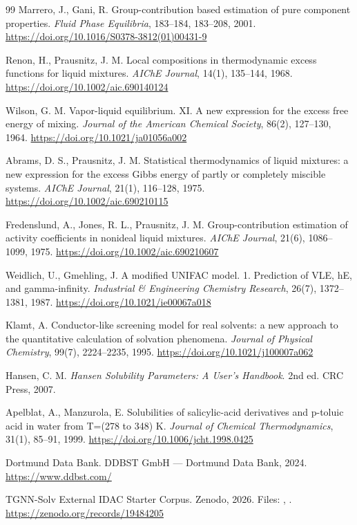 \documentclass[11pt]{article}
\DeclareRobustCommand{\code}[1]{\texttt{\detokenize{#1}}}
\theoremstyle{definition}
\begin{document}
\begin{thebibliography}{99}
 Marrero, J., Gani, R. Group-contribution based estimation of pure component properties. \textit{Fluid Phase Equilibria}, 183--184, 183--208, 2001. \url{https://doi.org/10.1016/S0378-3812(01)00431-9}

 Renon, H., Prausnitz, J. M. Local compositions in thermodynamic excess functions for liquid mixtures. \textit{AIChE Journal}, 14(1), 135--144, 1968. \url{https://doi.org/10.1002/aic.690140124}

 Wilson, G. M. Vapor-liquid equilibrium. XI. A new expression for the excess free energy of mixing. \textit{Journal of the American Chemical Society}, 86(2), 127--130, 1964. \url{https://doi.org/10.1021/ja01056a002}

 Abrams, D. S., Prausnitz, J. M. Statistical thermodynamics of liquid mixtures: a new expression for the excess Gibbs energy of partly or completely miscible systems. \textit{AIChE Journal}, 21(1), 116--128, 1975. \url{https://doi.org/10.1002/aic.690210115}

 Fredenslund, A., Jones, R. L., Prausnitz, J. M. Group-contribution estimation of activity coefficients in nonideal liquid mixtures. \textit{AIChE Journal}, 21(6), 1086--1099, 1975. \url{https://doi.org/10.1002/aic.690210607}

 Weidlich, U., Gmehling, J. A modified UNIFAC model. 1. Prediction of VLE, hE, and gamma-infinity. \textit{Industrial \& Engineering Chemistry Research}, 26(7), 1372--1381, 1987. \url{https://doi.org/10.1021/ie00067a018}

 Klamt, A. Conductor-like screening model for real solvents: a new approach to the quantitative calculation of solvation phenomena. \textit{Journal of Physical Chemistry}, 99(7), 2224--2235, 1995. \url{https://doi.org/10.1021/j100007a062}

 Hansen, C. M. \textit{Hansen Solubility Parameters: A User's Handbook}. 2nd ed. CRC Press, 2007.

 Apelblat, A., Manzurola, E. Solubilities of salicylic-acid derivatives and p-toluic acid in water from T=(278 to 348) K. \textit{Journal of Chemical Thermodynamics}, 31(1), 85--91, 1999. \url{https://doi.org/10.1006/jcht.1998.0425}

 Dortmund Data Bank. DDBST GmbH --- Dortmund Data Bank, 2024. \url{https://www.ddbst.com/}

 TGNN-Solv External IDAC Starter Corpus. Zenodo, 2026. Files: \code{idac.csv}, \code{idac_seed_dois.txt}. \url{https://zenodo.org/records/19484205}


\end{thebibliography}
\end{document}
